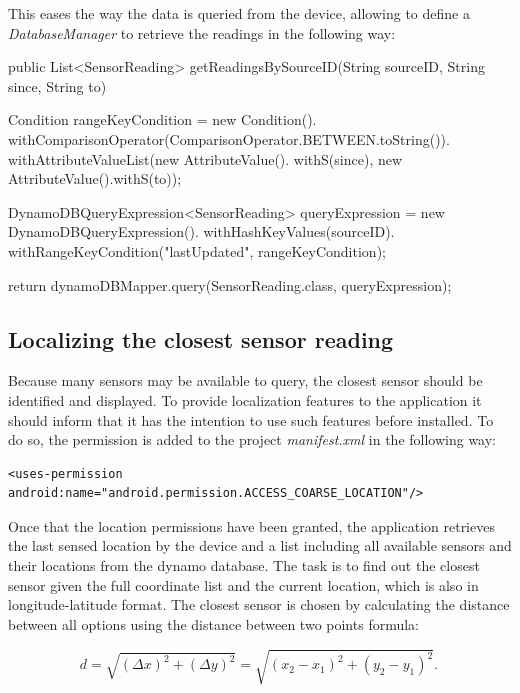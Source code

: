This eases the way the data is queried from the device, allowing to define a \textit{DatabaseManager} to retrieve the readings in the following way: 

{\centering
\begin{spverbatim}
public List<SensorReading> getReadingsBySourceID(String sourceID, String since, String to) {

  Condition rangeKeyCondition = new Condition().
    withComparisonOperator(ComparisonOperator.BETWEEN.toString()).
    withAttributeValueList(new AttributeValue().
    withS(since), new AttributeValue().withS(to));

  DynamoDBQueryExpression<SensorReading> queryExpression = new
    DynamoDBQueryExpression().
    withHashKeyValues(sourceID).
    withRangeKeyCondition("lastUpdated", rangeKeyCondition);
  
return dynamoDBMapper.query(SensorReading.class, queryExpression);
}
\end{spverbatim}
\par
}

\subsection{Localizing the closest sensor reading}
Because many sensors may be available to query, the closest sensor should be identified and displayed. To provide localization features to the application it should inform that it has the intention to use such features before installed. To do so, the permission is added to the project \textit{manifest.xml} in the following way: \bigskip

{\centering
\begin{BVerbatim}
<uses-permission android:name="android.permission.ACCESS_COARSE_LOCATION"/>
\end{BVerbatim}
\par
}
\bigskip

Once that the location permissions have been granted, the application retrieves the last sensed location by the device and a list including all available sensors and their locations from the dynamo database. The task is to find out the closest sensor given the full coordinate list and the current location, which is also in longitude-latitude format. The closest sensor is chosen by calculating the distance between all options using the distance between two points formula: 

\begin{equation}
d={\sqrt {(\Delta x)^{2}+(\Delta y)^{2}}}={\sqrt {(x_{2}-x_{1})^{2}+(y_{2}-y_{1})^{2}}}.\,
\end{equation}

